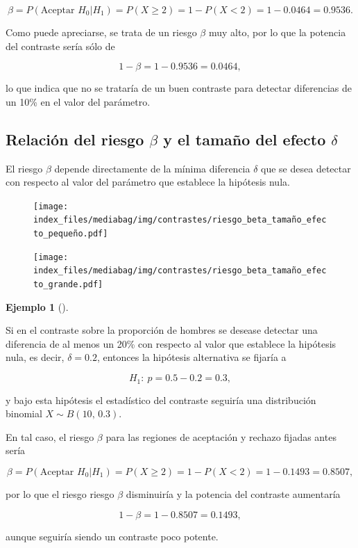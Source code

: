 \documentclass[
  a4paper,
]{scrreport}
\theoremstyle{definition}
\theoremstyle{definition}
\newtheorem{example}{Ejemplo}[chapter]
\theoremstyle{plain}
\theoremstyle{remark}
\begin{document}
\[\beta = P(\mbox{Aceptar }H_0|H_1) = P(X\geq 2) = 1 - P(X<2) = 1-0.0464 = 0.9536.\]

Como puede apreciarse, se trata de un riesgo \(\beta\) muy alto, por lo
que la potencia del contraste sería sólo de

\[1-\beta = 1-0.9536 = 0.0464,\]

lo que indica que no se trataría de un buen contraste para detectar
diferencias de un 10\% en el valor del parámetro.

\hypertarget{relaciuxf3n-del-riesgo-beta-y-el-tamauxf1o-del-efecto-delta}{%
\subsection{\texorpdfstring{Relación del riesgo \(\beta\) y el tamaño
del efecto
\(\delta\)}{Relación del riesgo \textbackslash beta y el tamaño del efecto \textbackslash delta}}\label{relaciuxf3n-del-riesgo-beta-y-el-tamauxf1o-del-efecto-delta}}

El riesgo \(\beta\) depende directamente de la mínima diferencia
\(\delta\) que se desea detectar con respecto al valor del parámetro que
establece la hipótesis nula.

\begin{figure}

{\centering \texttt{[image: index\_files/mediabag/img/contrastes/riesgo\_beta\_tamaño\_efecto\_pequeño.pdf]}

}

\end{figure}

\begin{figure}

{\centering \texttt{[image: index\_files/mediabag/img/contrastes/riesgo\_beta\_tamaño\_efecto\_grande.pdf]}

}

\end{figure}

\begin{example}[]\protect\hypertarget{exm-potencia-contraste}{}\label{exm-potencia-contraste}

Si en el contraste sobre la proporción de hombres se desease detectar
una diferencia de al menos un 20\% con respecto al valor que establece
la hipótesis nula, es decir, \(\delta=0.2\), entonces la hipótesis
alternativa se fijaría a

\[H_1:\ p=0.5-0.2=0.3,\]

y bajo esta hipótesis el estadístico del contraste seguiría una
distribución binomial \(X\sim B(10,\,0.3)\).

En tal caso, el riesgo \(\beta\) para las regiones de aceptación y
rechazo fijadas antes sería

\[\beta = P(\mbox{Aceptar }H_0|H_1) = P(X\geq 2) = 1 - P(X<2) = 1-0.1493 = 0.8507,\]

por lo que el riesgo riesgo \(\beta\) disminuiría y la potencia del
contraste aumentaría

\[1-\beta = 1-0.8507 = 0.1493,\]

aunque seguiría siendo un contraste poco potente.

\end{example}
\end{document}
